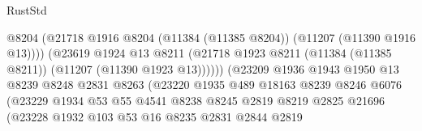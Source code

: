 \begin{lexlean}{RustStd}
\begin{coremodule}
                                            @8204
                                            (@21718
                                              @1916
                                              @8204
                                              (@11384 (@11385 @8204))
                                              (@11207 (@11390 @1916 @13))))
                                          (@23619
                                            @1924
                                            @13
                                            @8211
                                            (@21718
                                              @1923
                                              @8211
                                              (@11384 (@11385 @8211))
                                              (@11207 (@11390 @1923 @13))))))
                                      (@23209
                                        @1936
                                        @1943
                                        @1950
                                        @13
                                        @8239
                                        @8248
                                        @2831
                                        @8263
                                        (@23220
                                          @1935
                                          @489
                                          @18163
                                          @8239
                                          @8246
                                          @6076
                                          (@23229
                                            @1934
                                            @53
                                            @55
                                            @4541
                                            @8238
                                            @8245
                                            @2819
                                            @8219
                                            @2825
                                            @21696
                                            (@23228
                                              @1932
                                              @103
                                              @53
                                              @16
                                              @8235
                                              @2831
                                              @2844
                                              @2819

\end{coremodule}
\end{lexlean}
